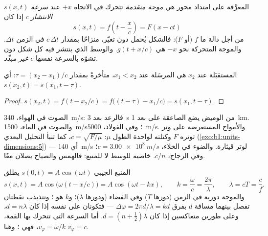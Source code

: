 \begin{definition}\label{def:b1:wave-propagation:travelling}
 $s(x, t)$ المعرَّفة على امتداد محور هي \emph{موجة متقدمة}
تتحرك في الاتجاه $+x$ عند \emph{سرعة الانتشار} $c$ إذا كان
\[
s(x, t) = f\!\left(t - \frac{x}{c}\right) = F(x - ct)
\]
من أجل دالة ما $f$ (أو $F$): فالشكل يُحمل دون تغيّر،
منزاحًا بمقدار $c\,\Delta t$ في الزمن $\Delta t$. والموجة المتحركة نحو $-x$ هي
$g(t + x/c)$. والوسط الذي ينتشر فيه كل شكل دون تشوّه بالسرعة
نفسها $c$ \emph{غير مبدِّد}.
\end{definition}

\begin{proposition}[التأخير]\label{prop:b1:wave-propagation:delay}
 المستقبَلة عند $x_2$ هي  المرسَلة عند $x_1 < x_2$،
متأخرةً بمقدار $\tau = (x_2 - x_1)/c$: أي $s(x_2, t) = s(x_1, t - \tau)$.
\end{proposition}

\begin{proof}
$s(x_2, t) = f(t - x_2/c) = f\big((t - \tau) - x_1/c\big) = s(x_1, t - \tau)$.
\end{proof}

\begin{example}\label{ex:b1:wave-propagation:celerities}
الصوت في الهواء، \qty{340}{m/s}: فالرعد بعد \qty{3}{s} من الوميض يضع
الصاعقة على بعد \qty{1}{km}. والصوت في الماء، \qty{1500}{m/s}؛ وفي الفولاذ،
\qty{5000}{m/s}. والأمواج المستعرضة على وتر توتره $F$ وكتلته
لواحدة الطول $\mu$: $c = \sqrt{F/\mu}$، كما تنبأ التحليل البعدي
(\cref{exo:b1:units-dimensions:5}) --- أي \qty{140}{m/s} لوتر
قيثارة. والضوء في الخلاء، $c = \qty{3.00e8}{m/s}$؛ وفي الزجاج،
$c/n$.  خاصية للوسط لا للمنبع: فالهمس
والصياح يصلان معًا.
\end{example}

\begin{proposition}\label{prop:b1:wave-propagation:sinusoidal}
المنبع الجيبي $s(0, t) = A\cos(\omega t)$ يطلق
\[
s(x, t) = A\cos\!\big(\omega(t - x/c)\big) = A\cos(\omega t - kx),
\qquad k = \frac{\omega}{c} = \frac{2\pi}{\lambda},
\qquad \lambda = cT = \frac{c}{f}.
\]
والموجة دورية في الزمن (دورها $T$) وفي الفضاء (ودورها
\emph{} $\lambda$)؛ و$k$ هو \emph{}؛ وتتذبذب
نقطتان تفصل بينهما مسافة $d$ بفرق 
$\Delta\varphi = 2\pi d/\lambda = kd$ --- فتكونان على  نفسه إذا كان $d = n\lambda$، وعلى
طورين متعاكسين إذا كان $d = (n + \tfrac12)\lambda$. أما السرعة التي تتحرك بها
القمة، $v_\varphi = \omega/k$، فهي \emph{}؛
وهنا $v_\varphi = c$.
\end{proposition}

